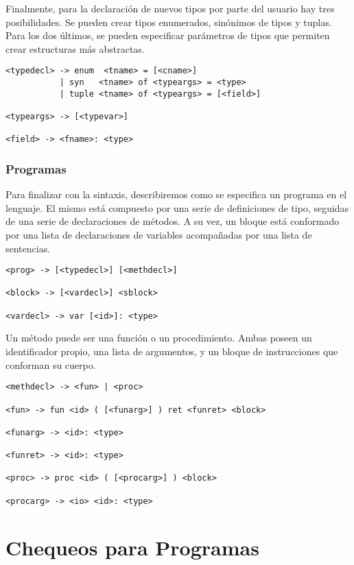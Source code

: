\documentclass{article}
\begin{document}
Finalmente, para la declaración de nuevos tipos por parte del usuario hay tres posibilidades.
Se pueden crear tipos enumerados, sinónimos de tipos y tuplas.
Para los dos últimos, se pueden especificar parámetros de tipos que permiten crear estructuras más abstractas.

\begin{lstlisting}[style = syntax]
<typedecl> -> enum  <tname> = [<cname>]
           | syn   <tname> of <typeargs> = <type>
           | tuple <tname> of <typeargs> = [<field>]

<typeargs> -> [<typevar>]

<field> -> <fname>: <type>
\end{lstlisting}

\subsubsection{Programas}

Para finalizar con la sintaxis, describiremos como se especifica un programa en el lenguaje.
El mismo está compuesto por una serie de definiciones de tipo, seguidas de una serie de declaraciones de métodos.
A su vez, un bloque está conformado por una lista de declaraciones de variables acompañadas por una lista de sentencias.

\begin{lstlisting}[style = syntax]
<prog> -> [<typedecl>] [<methdecl>]

<block> -> [<vardecl>] <sblock>

<vardecl> -> var [<id>]: <type>
\end{lstlisting}

Un método puede ser una función o un procedimiento.
Ambas poseen un identificador propio, una lista de argumentos, y un bloque de instrucciones que conforman su cuerpo.

\begin{lstlisting}[style = syntax]
<methdecl> -> <fun> | <proc>

<fun> -> fun <id> ( [<funarg>] ) ret <funret> <block>

<funarg> -> <id>: <type>

<funret> -> <id>: <type>

<proc> -> proc <id> ( [<procarg>] ) <block>

<procarg> -> <io> <id>: <type>
\end{lstlisting}

\section{Chequeos para Programas}
\end{document}
